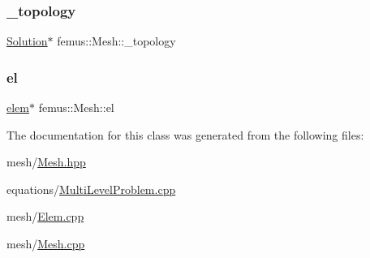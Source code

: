 \mbox{\label{classfemus_1_1_mesh_ac436cfb1f4caaec0c4335358ff8a51d8}} 
\subsubsection{\texorpdfstring{\+\_\+topology}{\_topology}}
{\footnotesize\ttfamily \mbox{\hyperlink{classfemus_1_1_solution}{Solution}}$\ast$ femus\+::\+Mesh\+::\+\_\+topology}

\mbox{\label{classfemus_1_1_mesh_a62689335aebc9de69b7490bfb32f0978}} 
\subsubsection{\texorpdfstring{el}{el}}
{\footnotesize\ttfamily \mbox{\hyperlink{classfemus_1_1elem}{elem}}$\ast$ femus\+::\+Mesh\+::el}



The documentation for this class was generated from the following files\+:\begin{DoxyCompactItemize}
\item 
mesh/\mbox{\hyperlink{_mesh_8hpp}{Mesh.\+hpp}}\item 
equations/\mbox{\hyperlink{_multi_level_problem_8cpp}{Multi\+Level\+Problem.\+cpp}}\item 
mesh/\mbox{\hyperlink{_elem_8cpp}{Elem.\+cpp}}\item 
mesh/\mbox{\hyperlink{_mesh_8cpp}{Mesh.\+cpp}}\end{DoxyCompactItemize}
